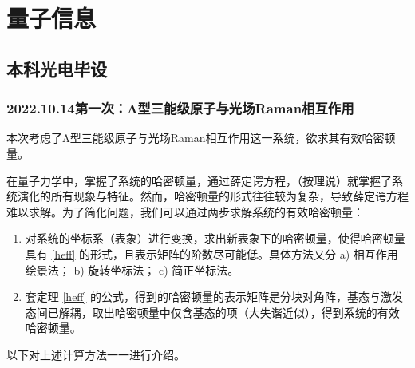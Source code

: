 \documentclass[
fontsetup = font-setup-open.tex,
titlesetup = titles-setup.tex
]{AJbook}
\numberwithin{equation}{section}
\begin{document}
\frontmatter	%

\mainmatter		%

\part{量子信息}
\chapter{本科光电毕设}
\section[2022.10.14第一次]{2022.10.14第一次：Λ型三能级原子与光场Raman相互作用}
本次考虑了Λ型三能级原子与光场Raman相互作用这一系统，欲求其有效哈密顿量。

在量子力学中，掌握了系统的哈密顿量，通过薛定谔方程，（按理说）就掌握了系统演化的所有现象与特征。然而，哈密顿量的形式往往较为复杂，导致薛定谔方程难以求解。为了简化问题，我们可以通过两步求解系统的有效哈密顿量：
\begin{enumerate}
\item 对系统的坐标系（表象）进行变换，求出新表象下的哈密顿量，使得哈密顿量具有 \ref{heff} 的形式，且表示矩阵的阶数尽可能低。具体方法又分 a) 相互作用绘景法； b) 旋转坐标法； c) 简正坐标法。
\item 套定理 \ref{heff} 的公式，得到的哈密顿量的表示矩阵是分块对角阵，基态与激发态间已解耦，取出哈密顿量中仅含基态的项（大失谐近似），得到系统的有效哈密顿量。
\end{enumerate}

以下对上述计算方法一一进行介绍。
\end{document}
